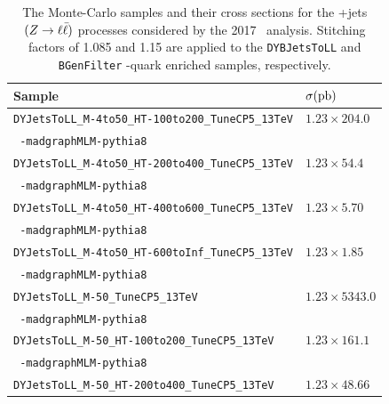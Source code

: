\begin{table}[htbp]
  \caption[\bosZ+jets $(\bosZ \rightarrow \ell\bar{\ell})$ Samples for \VHbb\ 2017]{The Monte-Carlo samples and their cross sections for the \bosZ+jets $(\bosZ \rightarrow \ell\bar{\ell})$ processes considered by the 2017 \VHbb\ analysis. Stitching factors of 1.085 and 1.15 are applied to the \texttt{DYBJetsToLL} and \texttt{BGenFilter} \qrkb-quark enriched samples, respectively.}
  \label{tbl:MCZtoLL}
  \small
  \begin{tabularx}{6.5in}{lX}
    \hline
    Sample                                                              & $\sigma (\mathrm{pb})$                    \\
    \hline
    \texttt{DYJetsToLL\_M-4to50\_HT-100to200\_TuneCP5\_13TeV}           & $1.23 \times 204.0$               \\
    \texttt{  -madgraphMLM-pythia8}                                     &                                   \\
    \texttt{DYJetsToLL\_M-4to50\_HT-200to400\_TuneCP5\_13TeV}           & $1.23 \times 54.4$                \\
    \texttt{  -madgraphMLM-pythia8}                                     &                                   \\
    \texttt{DYJetsToLL\_M-4to50\_HT-400to600\_TuneCP5\_13TeV}           & $1.23 \times 5.70$                \\
    \texttt{  -madgraphMLM-pythia8}                                     &                                   \\
    \texttt{DYJetsToLL\_M-4to50\_HT-600toInf\_TuneCP5\_13TeV}           & $1.23 \times 1.85$                \\
    \texttt{  -madgraphMLM-pythia8}                                     &                                   \\
    \texttt{DYJetsToLL\_M-50\_TuneCP5\_13TeV}                           & $1.23 \times 5343.0$              \\
    \texttt{  -madgraphMLM-pythia8}                                     &                                   \\
    \texttt{DYJetsToLL\_M-50\_HT-100to200\_TuneCP5\_13TeV}              & $1.23 \times 161.1$               \\
    \texttt{  -madgraphMLM-pythia8}                                     &                                   \\
    \texttt{DYJetsToLL\_M-50\_HT-200to400\_TuneCP5\_13TeV}              & $1.23 \times 48.66$               \\

\end{tabularx}
\end{table}
